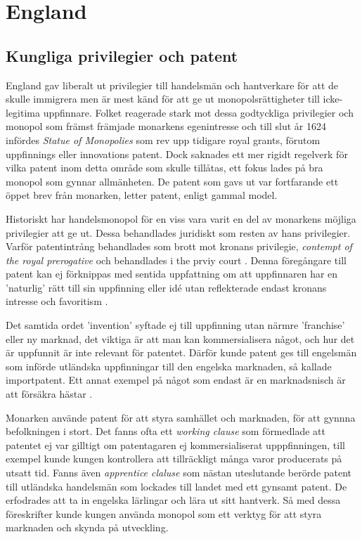 \section{England} 

\subsection{Kungliga privilegier och patent} 

England gav liberalt ut privilegier till handelsmän och hantverkare för att de skulle immigrera men är
mest känd för att ge ut monopolsrättigheter till icke-legitima uppfinnare. Folket reagerade stark mot
dessa godtyckliga privilegier och monopol som främst främjade monarkens egenintresse och till slut år 1624 infördes
\emph{Statue of Monopolies} som rev upp tidigare royal grants, förutom uppfinnings eller innovations patent.
Dock saknades ett mer rigidt regelverk för vilka patent inom detta område som skulle tillåtas, ett fokus
lades på bra monopol som gynnar allmänheten. De patent som gavs ut var fortfarande ett öppet brev från
monarken, letter patent, enligt gammal model.

Historiskt har handelsmonopol för en viss vara 
varit en del av monarkens möjliga privilegier att ge ut. Dessa behandlades
juridiskt som resten av hans privilegier. Varför patentintrång
behandlades som brott mot kronans privilegie, \emph{contempt of the royal prerogative} och behandlades i the prviy court \cite{macleod}. Denna
föregångare till patent kan ej förknippas med sentida uppfattning om att uppfinnaren har en 'naturlig' rätt till sin uppfinning eller idé
utan reflekterade endast kronans intresse och favoritism \cite{bracha}.

Det samtida ordet 'invention' syftade ej till uppfinning utan närmre 'franchise' eller ny marknad, det
viktiga är att man kan kommersialisera något, och hur det är uppfunnit är inte relevant för patentet\cite{bracha}.
Därför kunde patent ges till engelsmän som införde utländska uppfinningar till den engelska marknaden, så kallade importpatent.
Ett annat exempel på något som endast är en marknadsnisch är att försäkra hästar \cite{davies}.



Monarken använde patent för att styra samhället och marknaden, för att gynnna befolkningen i stort. Det fanns ofta ett \emph{working clause} som förmedlade att patentet ej var
gilltigt om patentagaren ej kommersialiserat upppfinningen, till exempel kunde kungen kontrollera att
tillräckligt många varor producerats på utsatt tid. Fanns även \emph{apprentice claluse} som nästan
uteslutande berörde patent till utländska handelsmän som lockades till landet med ett gynsamt patent. De erfodrades att ta in engelska lärlingar och
lära ut sitt hantverk. Så med dessa föreskrifter kunde kungen använda monopol som ett verktyg för att styra marknaden och skynda på utveckling.\cite{bracha}

